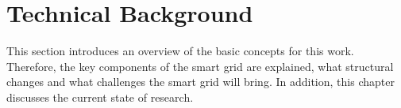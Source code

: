 \chapter{Technical Background}
\label{sec:state}







This section introduces an overview of the basic concepts for this work. Therefore, the key components of the smart grid are explained, what structural changes and what challenges the smart grid will bring.
In addition, this chapter discusses the current state of research.\\

